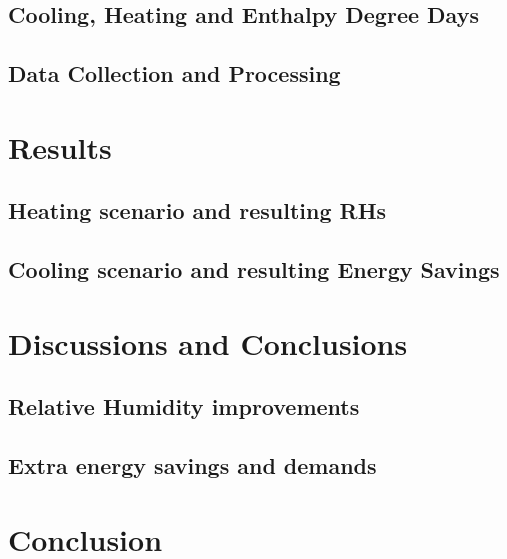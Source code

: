 \documentclass[review]{elsarticle}
\begin{document}
    \subsection{Cooling, Heating and Enthalpy Degree Days}
        
    \subsection{Data Collection and Processing}
        
\section{Results}
    \subsection{Heating scenario and resulting RHs}
    
    \subsection{Cooling scenario and resulting Energy Savings}
    
\section{Discussions and Conclusions}
    \subsection{Relative Humidity improvements}
    
    \subsection{Extra energy savings and demands}
    
\section{Conclusion}


\end{document}
